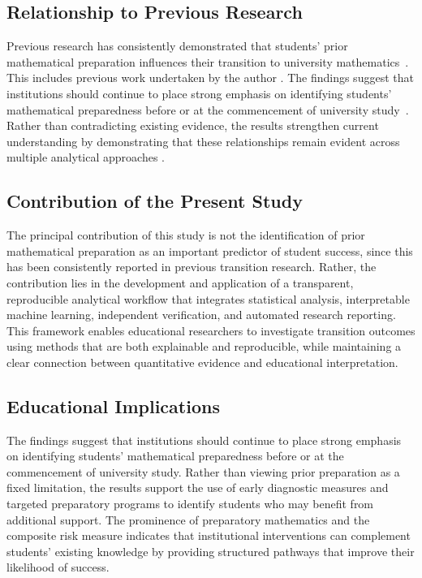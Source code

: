 \subsection*{Relationship to Previous Research}

Previous research has consistently demonstrated that students' prior mathematical preparation influences their transition to university 
mathematics~\cite{Hourigan2007underpreparedness,Wood2001,England2021transition}. This includes previous work undertaken by the author \cite{Stanley2025}. 
The findings suggest that institutions should continue to place strong emphasis on identifying students' mathematical preparedness before or at the 
commencement of university study~\cite{Reddy02122025}. Rather than contradicting existing evidence, the results strengthen current understanding by demonstrating that these relationships remain evident 
across multiple analytical approaches \cite{Hourigan2007underpreparedness,Wood2001,England2021transition}.

\subsection*{Contribution of the Present Study}

The principal contribution of this study is not the identification of prior mathematical preparation as an important predictor of student success, since this has been 
consistently reported in previous transition research. Rather, the contribution lies in the development and application of a transparent, reproducible analytical workflow 
that integrates statistical analysis, interpretable machine learning, independent verification, and automated research reporting. This framework enables educational 
researchers to investigate transition outcomes using methods that are both explainable and reproducible, while maintaining a clear connection between quantitative 
evidence and educational interpretation.

\subsection*{Educational Implications}

The findings suggest that institutions should continue to place strong emphasis on identifying students' mathematical preparedness before or at the commencement of 
university study. Rather than viewing prior preparation as a fixed limitation, the results support the use of early diagnostic measures and targeted preparatory programs 
to identify students who may benefit from additional support. The prominence of preparatory mathematics and the composite risk measure indicates that institutional 
interventions can complement students' existing knowledge by providing structured pathways that improve their likelihood of success.

